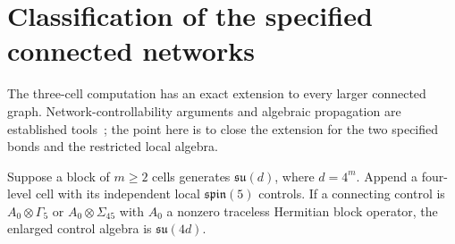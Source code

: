 \section{Classification of the specified connected networks}
The three-cell computation has an exact extension to every larger connected graph.
Network-controllability arguments and algebraic propagation are established tools~\cite{Burgarth2009}; the point here is to close the extension for the two specified bonds and the restricted local algebra.

\begin{lemma}\label{lem:extension}
Suppose a block of $m\geq2$ cells generates $\mathfrak{su}(d)$, where $d=4^m$.
Append a four-level cell with its independent local $\mathfrak{spin}(5)$ controls.
If a connecting control is $A_0\otimes\Gamma_5$ or $A_0\otimes\Sigma_{45}$ with $A_0$ a nonzero traceless Hermitian block operator, the enlarged control algebra is $\mathfrak{su}(4d)$.
\end{lemma}
